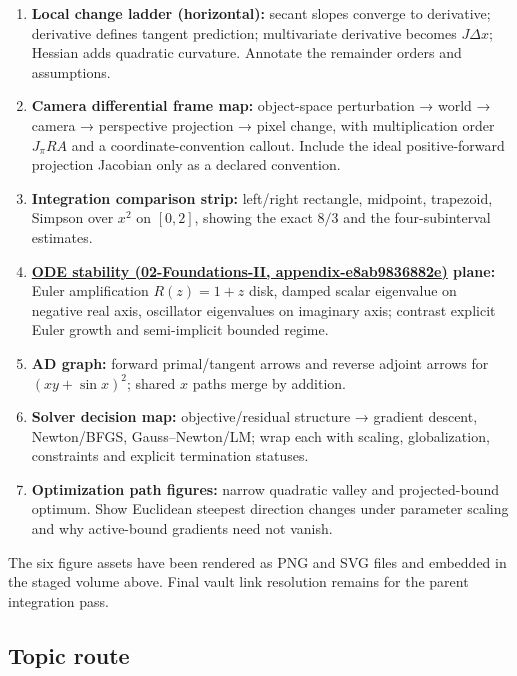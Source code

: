 \begin{enumerate}
\def\labelenumi{\arabic{enumi}.}
\tightlist
\item
  \textbf{Local change ladder (horizontal):} secant slopes converge to derivative; derivative defines tangent prediction; multivariate derivative becomes \(J\Delta x\); Hessian adds quadratic curvature. Annotate the remainder orders and assumptions.
\item
  \textbf{Camera differential frame map:} object-space perturbation → world → camera → perspective projection → pixel change, with multiplication order \(J_\pi R A\) and a coordinate-convention callout. Include the ideal positive-forward projection Jacobian only as a declared convention.
\item
  \textbf{Integration comparison strip:} left/right rectangle, midpoint, trapezoid, Simpson over \(x^2\) on \([0,2]\), showing the exact \(8/3\) and the four-subinterval estimates.
\item
  \textbf{\href{}{ODE stability (02-Foundations-II, appendix-e8ab9836882e)} plane:} Euler amplification \(R(z)=1+z\) disk, damped scalar eigenvalue on negative real axis, oscillator eigenvalues on imaginary axis; contrast explicit Euler growth and semi-implicit bounded regime.
\item
  \textbf{AD graph:} forward primal/tangent arrows and reverse adjoint arrows for \((xy+\sin x)^2\); shared \(x\) paths merge by addition.
\item
  \textbf{Solver decision map:} objective/residual structure → gradient descent, Newton/BFGS, Gauss--Newton/LM; wrap each with scaling, globalization, constraints and explicit termination statuses.
\item
  \textbf{Optimization path figures:} narrow quadratic valley and projected-bound optimum. Show Euclidean steepest direction changes under parameter scaling and why active-bound gradients need not vanish.
\end{enumerate}

The six figure assets have been rendered as PNG and SVG files and embedded in the staged volume above. Final vault link resolution remains for the parent integration pass.

\subsection{Topic route}\label{topic-route}

